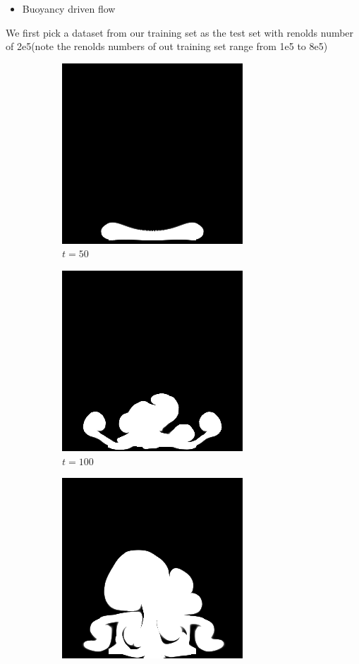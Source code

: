 \documentclass[a4paper,12pt,twoside]{report}
\begin{document}
\begin{itemize}
  \item Buoyancy driven flow
\end{itemize}
We first pick a dataset from our training set as the test set with renolds number of 2e5(note the renolds numbers of out training set range from 1e5 to 8e5)
\begin{figure}
\centering
\begin{subfigure}{0.18\textwidth}
  \centering
  \includegraphics[scale=0.28]{buoyancy/dens_000050_ref.png}
  \caption{$t=50$}
\end{subfigure}
\begin{subfigure}{0.18\textwidth}
  \centering
  \includegraphics[scale=0.28]{buoyancy/dens_000100_ref.png}
  \caption{$t=100$}
\end{subfigure}
\begin{subfigure}{0.18\textwidth}
  \centering
  \includegraphics[scale=0.28]{buoyancy/dens_000150_ref.png}

\end{subfigure}
\end{figure}
\end{document}
